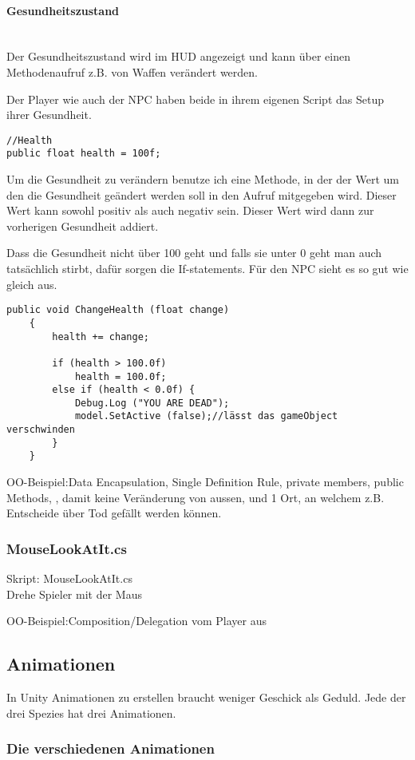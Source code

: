 \paragraph{Gesundheitszustand}\mbox{} \\
Der Gesundheitszustand wird im HUD angezeigt und kann über einen Methodenaufruf z.B. von Waffen verändert werden.

Der Player wie auch der NPC haben beide in ihrem eigenen Script das Setup ihrer Gesundheit.
\begin{lstlisting}
//Health
public float health = 100f;
\end{lstlisting}
Um die Gesundheit zu verändern benutze ich eine Methode, in der der Wert um den die Gesundheit geändert werden soll in den Aufruf mitgegeben wird. Dieser Wert kann sowohl positiv als auch negativ sein.
Dieser Wert wird dann zur vorherigen Gesundheit addiert.


Dass die Gesundheit nicht über 100 geht und falls sie unter 0 geht man auch tatsächlich stirbt, dafür sorgen die If-statements. Für den NPC sieht es so gut wie gleich aus.
\begin{lstlisting}
public void ChangeHealth (float change)
	{
		health += change;

		if (health > 100.0f)
			health = 100.0f;
		else if (health < 0.0f) {
			Debug.Log ("YOU ARE DEAD");
			model.SetActive (false);//lässt das gameObject verschwinden
		}
	}
\end{lstlisting}
OO-Beispiel:Data Encapsulation, Single Definition Rule, private members, public Methods, , damit keine Veränderung von aussen, und 1 Ort, an welchem z.B. Entscheide über Tod gefällt werden können.

\subsubsection{MouseLookAtIt.cs}
Skript: MouseLookAtIt.cs\\
Drehe Spieler mit der Maus

OO-Beispiel:Composition/Delegation vom Player aus

\subsection{Animationen}
In Unity Animationen zu erstellen braucht weniger Geschick als Geduld.
Jede der drei Spezies hat drei Animationen.


\subsubsection{Die verschiedenen Animationen}
